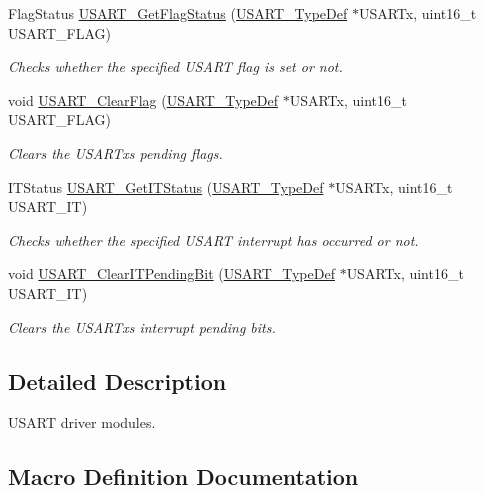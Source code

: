 \begin{DoxyCompactItemize}
Flag\+Status \hyperlink{group___u_s_a_r_t_ga144630722defc9e312f0ad280b68e9da}{U\+S\+A\+R\+T\+\_\+\+Get\+Flag\+Status} (\hyperlink{struct_u_s_a_r_t___type_def}{U\+S\+A\+R\+T\+\_\+\+Type\+Def} $\ast$U\+S\+A\+R\+Tx, uint16\+\_\+t U\+S\+A\+R\+T\+\_\+\+F\+L\+AG)
\begin{DoxyCompactList}\small\item\em Checks whether the specified U\+S\+A\+RT flag is set or not. \end{DoxyCompactList}\item 
void \hyperlink{group___u_s_a_r_t_gad962e148fc466ae1b45b288f6c91d966}{U\+S\+A\+R\+T\+\_\+\+Clear\+Flag} (\hyperlink{struct_u_s_a_r_t___type_def}{U\+S\+A\+R\+T\+\_\+\+Type\+Def} $\ast$U\+S\+A\+R\+Tx, uint16\+\_\+t U\+S\+A\+R\+T\+\_\+\+F\+L\+AG)
\begin{DoxyCompactList}\small\item\em Clears the U\+S\+A\+R\+Tx\textquotesingle{}s pending flags. \end{DoxyCompactList}\item 
I\+T\+Status \hyperlink{group___u_s_a_r_t_ga93d8f031241bcdbe938d091a85295445}{U\+S\+A\+R\+T\+\_\+\+Get\+I\+T\+Status} (\hyperlink{struct_u_s_a_r_t___type_def}{U\+S\+A\+R\+T\+\_\+\+Type\+Def} $\ast$U\+S\+A\+R\+Tx, uint16\+\_\+t U\+S\+A\+R\+T\+\_\+\+IT)
\begin{DoxyCompactList}\small\item\em Checks whether the specified U\+S\+A\+RT interrupt has occurred or not. \end{DoxyCompactList}\item 
void \hyperlink{group___u_s_a_r_t_ga1fc25d0338695063be5e50156955d9bc}{U\+S\+A\+R\+T\+\_\+\+Clear\+I\+T\+Pending\+Bit} (\hyperlink{struct_u_s_a_r_t___type_def}{U\+S\+A\+R\+T\+\_\+\+Type\+Def} $\ast$U\+S\+A\+R\+Tx, uint16\+\_\+t U\+S\+A\+R\+T\+\_\+\+IT)
\begin{DoxyCompactList}\small\item\em Clears the U\+S\+A\+R\+Tx\textquotesingle{}s interrupt pending bits. \end{DoxyCompactList}\end{DoxyCompactItemize}


\subsection{Detailed Description}
U\+S\+A\+RT driver modules. 



\subsection{Macro Definition Documentation}
